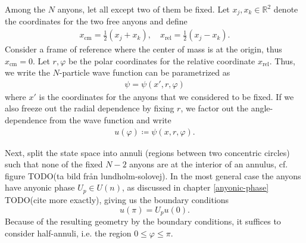 \documentclass[a4paper,10pt,oneside]{book}
\theoremstyle{plain}
\theoremstyle{definition}
\theoremstyle{remark}
\begin{document}
{Among the $N$ anyons, let all except two of them be fixed. Let $x_j, x_k \in \mathbb{R}^2$ denote the coordinates for the two free anyons and define
\begin{align*}
  x_\text{cm} = \frac{1}{2}(x_j + x_k), \quad
  x_\text{rel} = \frac{1}{2}(x_j - x_k).
\end{align*}
Consider a frame of reference where the center of mass is at the origin, thus $x_\text{cm} = 0$. Let $r, \varphi$ be the polar coordinates for the relative coordinate $x_\text{rel}$. Thus, we write the $N$-particle wave function can be parametrized as
\begin{align*}
  \psi = \psi(x', r, \varphi)
\end{align*}
where $x'$ is the coordinates for the anyons that we considered to be fixed. If we also freeze out the radial dependence by fixing $r$, we factor out the angle-dependence from the wave function and write
\begin{align*}
  u(\varphi) \coloneqq \psi(x, r, \varphi).
\end{align*}

Next, split the state space into annuli (regions between two concentric circles) such that none of the fixed $N-2$ anyons are at the interior of an annulus, cf. figure TODO(ta bild från lundholm-solovej). In the most general case the anyons have anyonic phase $U_p \in U(n)$, as discussed in chapter \cref{anyonic-phase} TODO(cite more exactly), giving us the boundary conditions
\begin{equation}\label{U_p boundary condition}
  u(\pi) = U_p u(0).
\end{equation}
Because of the resulting geometry by the boundary conditions, it suffices to consider half-annuli, i.e. the region $0 \le \varphi \le \pi$.

}
\end{document}
